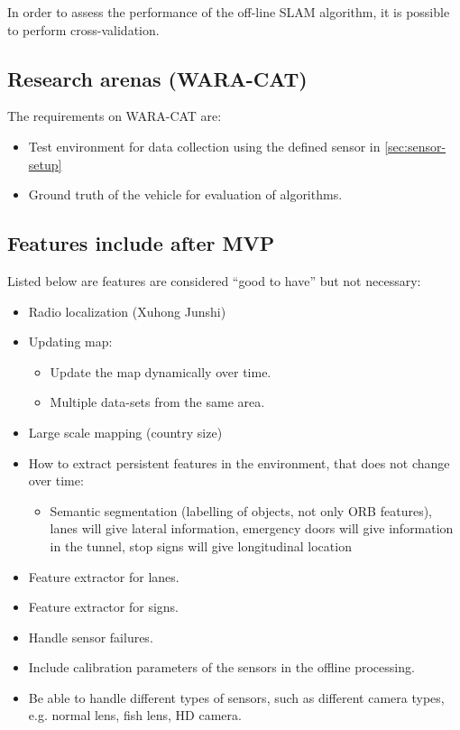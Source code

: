 In order to assess the performance of the off-line \gls{SLAM}
algorithm, it is possible to perform cross-validation.

\subsection{Research arenas (WARA-CAT)}


The requirements on WARA-CAT are:
\begin{itemize}
  \item Test environment for data collection using the defined sensor in
    \ref{sec:sensor-setup}
\item Ground truth of the vehicle for evaluation of algorithms.
\end{itemize}


\subsection{Features include after MVP}\label{sec:features}

Listed below are features are considered ``good to have'' but not
necessary:

\begin{itemize}
\item Radio localization  (Xuhong  Junshi)
\item Updating map:
  \begin{itemize}
  \item Update the map dynamically over time.
  \item Multiple data-sets from the same area.
  \end{itemize}
\item Large scale mapping (country size)
\item How to extract persistent features in the environment, that does
  not change over time:
  \begin{itemize}
  \item  Semantic segmentation (labelling of objects, not only ORB
    features), lanes will give lateral information, emergency doors
    will give information in the tunnel, stop signs will give
    longitudinal location
  \end{itemize}
\item Feature extractor for lanes.
\item Feature extractor for signs.
\item Handle sensor failures.
\item Include calibration parameters of the sensors in the offline processing.
\item Be able to handle different types of sensors, such as different camera types, e.g. normal lens, fish lens, HD camera.
\end{itemize}


